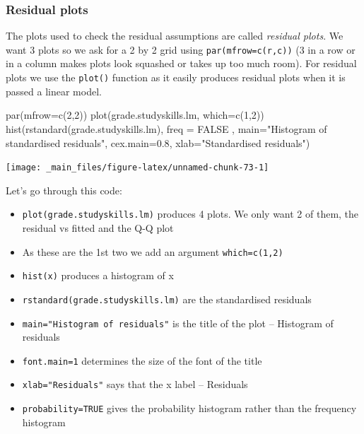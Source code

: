 \documentclass[
]{gitbook}
\newenvironment{Shaded}{\begin{snugshade}}{\end{snugshade}}
\newcommand{\AttributeTok}[1]{\textcolor[rgb]{0.77,0.63,0.00}{#1}}
\newcommand{\ConstantTok}[1]{\textcolor[rgb]{0.00,0.00,0.00}{#1}}
\newcommand{\DecValTok}[1]{\textcolor[rgb]{0.00,0.00,0.81}{#1}}
\newcommand{\FloatTok}[1]{\textcolor[rgb]{0.00,0.00,0.81}{#1}}
\newcommand{\FunctionTok}[1]{\textcolor[rgb]{0.00,0.00,0.00}{#1}}
\newcommand{\NormalTok}[1]{#1}
\newcommand{\StringTok}[1]{\textcolor[rgb]{0.31,0.60,0.02}{#1}}
\providecommand{\tightlist}{%
  \setlength{\itemsep}{0pt}\setlength{\parskip}{0pt}}
\begin{document}
\hypertarget{residual-plots}{%
\subsubsection{Residual plots}\label{residual-plots}}

The plots used to check the residual assumptions are called \emph{residual plots}. We want 3 plots so we ask for a 2 by 2 grid using \texttt{par(mfrow=c(r,c))} (3 in a row or in a column makes plots look squashed or takes up too much room). For residual plots we use the \texttt{plot()} function as it easily produces residual plots when it is passed a linear model.

\begin{Shaded}
\begin{Highlighting}[]
\FunctionTok{par}\NormalTok{(}\AttributeTok{mfrow=}\FunctionTok{c}\NormalTok{(}\DecValTok{2}\NormalTok{,}\DecValTok{2}\NormalTok{))}
\FunctionTok{plot}\NormalTok{(grade.studyskills.lm, }\AttributeTok{which=}\FunctionTok{c}\NormalTok{(}\DecValTok{1}\NormalTok{,}\DecValTok{2}\NormalTok{))}
\FunctionTok{hist}\NormalTok{(}\FunctionTok{rstandard}\NormalTok{(grade.studyskills.lm), }\AttributeTok{freq =} \ConstantTok{FALSE}\NormalTok{ , }
     \AttributeTok{main=}\StringTok{"Histogram of standardised residuals"}\NormalTok{, }
     \AttributeTok{cex.main=}\FloatTok{0.8}\NormalTok{, }\AttributeTok{xlab=}\StringTok{"Standardised residuals"}\NormalTok{)}
\end{Highlighting}
\end{Shaded}

\begin{center}\texttt{[image: \_main\_files/figure-latex/unnamed-chunk-73-1]} \end{center}

Let's go through this code:

\begin{itemize}
\tightlist
\item
  \texttt{plot(grade.studyskills.lm)} produces 4 plots. We only want 2 of them, the residual vs fitted and the Q-Q plot
\item
  As these are the 1st two we add an argument \texttt{which=c(1,2)}
\item
  \texttt{hist(x)} produces a histogram of x
\item
  \texttt{rstandard(grade.studyskills.lm)} are the standardised residuals
\item
  \texttt{main="Histogram\ of\ residuals"} is the title of the plot -- Histogram of residuals
\item
  \texttt{font.main=1} determines the size of the font of the title
\item
  \texttt{xlab="Residuals"} says that the x label -- Residuals
\item
  \texttt{probability=TRUE} gives the probability histogram rather than the frequency histogram
\end{itemize}
\end{document}
